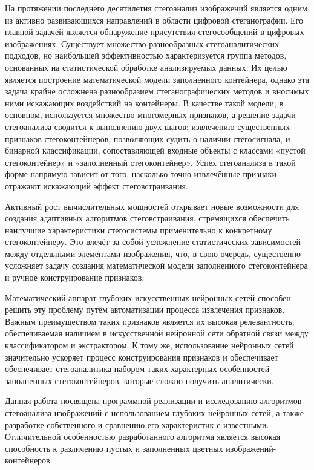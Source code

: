 

На протяжении последнего десятилетия стегоанализ изображений является одним из активно развивающихся направлений в области цифровой стеганографии. Его главной задачей является обнаружение присутствия стегосообщений в цифровых изображениях. Существует множество разнообразных стегоаналитических подходов, но наибольшей эффективностью характеризуется группа методов, основанных на статистической обработке анализируемых данных. Их целью является построение математической модели заполненного контейнера, однако эта задача крайне осложнена разнообразием стеганографических методов и вносимых ними искажающих воздействий на контейнеры. В качестве такой модели, в основном, используется множество многомерных признаков, а решение задачи стегоанализа сводится к выполнению двух шагов: извлечению существенных признаков стегоконтейнеров, позволяющих судить о наличии стегосигнала, и бинарной классификации, сопоставляющей входные объекты с классами «пустой стегоконтейнер» и «заполненный стегоконтейнер». Успех стегоанализа в такой форме напрямую зависит от того, насколько точно извлечённые признаки отражают искажающий эффект стеговстраивания.

Активный рост вычислительных мощностей открывает новые возможности для создания адаптивных алгоритмов стеговстраивания, стремящихся обеспечить наилучшие характеристики стегосистемы применительно к конкретному стегоконтейнеру. Это влечёт за собой усложнение статистических зависимостей между отдельными элементами изображения, что, в свою очередь, существенно усложняет задачу создания математической модели заполненного стегоконтейнера и ручное конструирование признаков.

Математический аппарат глубоких искусственных нейронных сетей способен решить эту проблему путём автоматизации процесса извлечения признаков. Важным преимуществом таких признаков является их высокая релевантность, обеспечиваемая наличием в искусственной нейронной сети обратной связи между классификатором и экстрактором. К тому же, использование нейронных сетей значительно ускоряет процесс конструирования признаков и обеспечивает обеспечивает стегоаналитика набором таких характерных особенностей заполненных стегоконтейнеров, которые сложно получить аналитически.

Данная работа посвящена программной реализации и исследованию алгоритмов стегоанализа изображений с использованием глубоких нейронных сетей, а также разработке собственного и сравнению его характеристик с известными. Отличительной особенностью разработанного алгоритма является высокая способность к различению пустых и заполненных цветных изображений-контейнеров.

\clearpage
